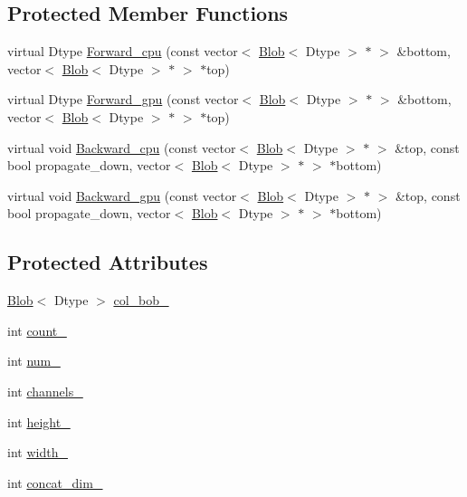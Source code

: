 \subsection*{Protected Member Functions}
\begin{DoxyCompactItemize}
\item 
virtual Dtype \hyperlink{classcaffe_1_1_concat_layer_a8d0ef15036059a8b5545c886360148ae}{Forward\+\_\+cpu} (const vector$<$ \hyperlink{classcaffe_1_1_blob}{Blob}$<$ Dtype $>$ $\ast$ $>$ \&bottom, vector$<$ \hyperlink{classcaffe_1_1_blob}{Blob}$<$ Dtype $>$ $\ast$ $>$ $\ast$top)
\item 
virtual Dtype \hyperlink{classcaffe_1_1_concat_layer_a92913d7f28a319354470e56fd306b628}{Forward\+\_\+gpu} (const vector$<$ \hyperlink{classcaffe_1_1_blob}{Blob}$<$ Dtype $>$ $\ast$ $>$ \&bottom, vector$<$ \hyperlink{classcaffe_1_1_blob}{Blob}$<$ Dtype $>$ $\ast$ $>$ $\ast$top)
\item 
virtual void \hyperlink{classcaffe_1_1_concat_layer_ad9f664216981e5f2248cdf88b49c5015}{Backward\+\_\+cpu} (const vector$<$ \hyperlink{classcaffe_1_1_blob}{Blob}$<$ Dtype $>$ $\ast$ $>$ \&top, const bool propagate\+\_\+down, vector$<$ \hyperlink{classcaffe_1_1_blob}{Blob}$<$ Dtype $>$ $\ast$ $>$ $\ast$bottom)
\item 
virtual void \hyperlink{classcaffe_1_1_concat_layer_a86ff8e3cd7ae4f06b23751b60d43ba76}{Backward\+\_\+gpu} (const vector$<$ \hyperlink{classcaffe_1_1_blob}{Blob}$<$ Dtype $>$ $\ast$ $>$ \&top, const bool propagate\+\_\+down, vector$<$ \hyperlink{classcaffe_1_1_blob}{Blob}$<$ Dtype $>$ $\ast$ $>$ $\ast$bottom)
\end{DoxyCompactItemize}
\subsection*{Protected Attributes}
\begin{DoxyCompactItemize}
\item 
\hyperlink{classcaffe_1_1_blob}{Blob}$<$ Dtype $>$ \hyperlink{classcaffe_1_1_concat_layer_a03737f00c69377dd5170c407541d40ff}{col\+\_\+bob\+\_\+}
\item 
int \hyperlink{classcaffe_1_1_concat_layer_a2e8c2179da287e21df345183f431bd72}{count\+\_\+}
\item 
int \hyperlink{classcaffe_1_1_concat_layer_a29dac7e4ccd6c477006551b591269566}{num\+\_\+}
\item 
int \hyperlink{classcaffe_1_1_concat_layer_a5f1ed4b44d327f638b683a6c34348e31}{channels\+\_\+}
\item 
int \hyperlink{classcaffe_1_1_concat_layer_abef01ab0023d78b6df16a7d8e68817c0}{height\+\_\+}
\item 
int \hyperlink{classcaffe_1_1_concat_layer_aae82aa5826cdd79a27c35da49728be4c}{width\+\_\+}
\item 
int \hyperlink{classcaffe_1_1_concat_layer_a85d219531768269ba18f3c331ad94301}{concat\+\_\+dim\+\_\+}
\end{DoxyCompactItemize}


